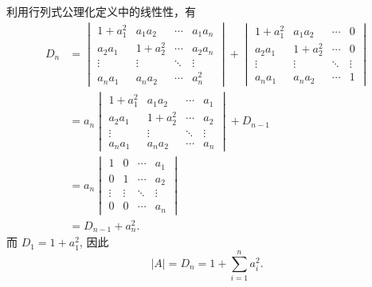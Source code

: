 \begin{exercise}
\begin{exgroup}
\begin{answer}
            利用行列式公理化定义中的线性性，有
            \begin{align*}
                D_n &= \begin{vmatrix}
                    1+a_1^2 & a_1a_2  & \cdots & a_1a_n  \\
                    a_2a_1  & 1+a_2^2 & \cdots & a_2a_n  \\
                    \vdots  & \vdots  & \ddots & \vdots  \\
                    a_na_1  & a_na_2  & \cdots & a_n^2
                \end{vmatrix} + \begin{vmatrix}
                    1+a_1^2 & a_1a_2  & \cdots & 0       \\
                    a_2a_1  & 1+a_2^2 & \cdots & 0       \\
                    \vdots  & \vdots  & \ddots & \vdots  \\
                    a_na_1  & a_na_2  & \cdots & 1
                \end{vmatrix} \\
                &= a_n \begin{vmatrix}
                    1+a_1^2 & a_1a_2  & \cdots & a_1     \\
                    a_2a_1  & 1+a_2^2 & \cdots & a_2     \\
                    \vdots  & \vdots  & \ddots & \vdots  \\
                    a_na_1  & a_na_2  & \cdots & a_n
                \end{vmatrix} + D_{n-1} \\
                &= a_n \begin{vmatrix}
                    1      & 0      & \cdots & a_1     \\
                    0      & 1      & \cdots & a_2     \\
                    \vdots & \vdots & \ddots & \vdots  \\
                    0      & 0      & \cdots & a_n
                \end{vmatrix} \\
                &= D_{n-1} + a_n^2.
            \end{align*}
            而 $D_1 = 1 + a_1^2$, 因此
            \[
                |A| = D_n = 1 + \sum_{i=1}^n a_i^2.
            \]
        \end{answer}


\end{exgroup}
\end{exercise}
